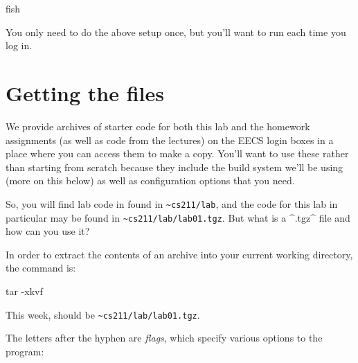 \documentclass{tufte-handout}
\begin{document}
\begin{CmdLine*}
  \C fish \\
\end{CmdLine*}

You only need to do the above setup once, but you’ll
want to run  each time you log in.


\section{Getting the files}

We provide archives of starter code for both this lab and the homework
assignments (as well as code from the lectures) on the EECS login boxes
in a place where you can access them to make a copy. You'll want to use
these rather than starting from scratch because they include the build
system we’ll be using (more on this below) as well as configuration
options that you need.

So, you will find lab code in found in \verb^~cs211/lab^,%
 and the code for this lab in
particular may be found in \verb^~cs211/lab/lab01.tgz^. But what is a ^.tgz^
file and how can you use it?

In order to extract the contents of an archive into your current working
directory, the command is:

\begin{CmdLine*}
  \C tar -xkvf \\
\end{CmdLine*}

\noindent
This week,  should be \verb^~cs211/lab/lab01.tgz^.

The letters after the hyphen are \emph{flags}, which specify various
options to the program:
\end{document}
